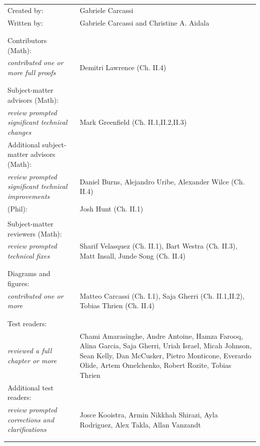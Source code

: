 \documentclass[11pt,letterpaper,fleqn]{memoir} %
\begin{document}
\begin{table}[h]
\centering
\begin{tabular}{>{\raggedleft}p{} >{\raggedright\arraybackslash}p{}}
Created by: & Gabriele Carcassi \\
Written by: & Gabriele Carcassi and Christine A. Aidala \\
& \\
& \\
Contributors (Math): \\ \textit{\footnotesize contributed one or more full proofs} & Demitri Lawrence (Ch. II.4) \\
& \\
& \\
Subject-matter advisors (Math): \\ \textit{\footnotesize review prompted significant technical changes} & Mark Greenfield (Ch. II.1,II.2,II.3) \\
Additional subject-matter advisors (Math): \\ \textit{\footnotesize review prompted significant technical improvements} & Daniel Burns, Alejandro Uribe, Alexander Wilce (Ch. II.4) \\
(Phil):  & Josh Hunt (Ch. II.1) \\
& \\
Subject-matter reviewers (Math): \\ \textit{\footnotesize review prompted technical fixes} & Sharif Velasquez (Ch. II.1), Bart Westra (Ch. II.3), Matt Insall, Junde Song (Ch. II.4) \\
& \\
& \\
Diagrams and figures: \\ \textit{\footnotesize contributed one or more} & Matteo Carcassi (Ch. I.1), Saja Gherri (Ch. II.1,II.2), Tobias Thrien (Ch. II.4) \\
& \\
& \\
Test readers: \\ \textit{\footnotesize reviewed a full chapter or more} & Chami Amarasinghe, Andre Antoine, Hamza Farooq, Alina Garcia, Saja Gherri, Uriah Israel, Micah Johnson, Sean Kelly, Dan McCusker, Pietro Monticone, Everardo Olide, Artem Omelchenko, Robert Rozite, Tobias Thrien \\
Additional test readers: \\ \textit{\footnotesize review prompted corrections and clarifications} & Josce Kooistra, Armin Nikkhah Shirazi, Ayla Rodriguez, Alex Takla, Allan Vanzandt \\
& \\
& \\



\end{tabular}
\end{table}
\end{document}

